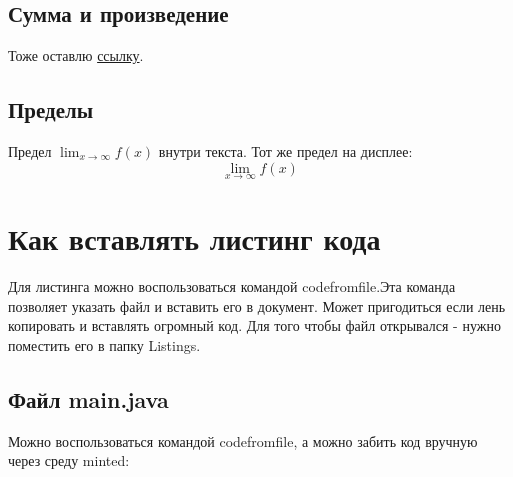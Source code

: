     \subsection{Сумма и произведение}
    Тоже оставлю \href{https://www.overleaf.com/learn/latex/Integrals,_sums_and_limits#Sums_and_products}{ссылку}.
    
    \subsection{Пределы}
    
    Предел \(\lim_{x\to\infty} f(x)\) внутри текста.
    Тот же предел на дисплее:
    \[
    \lim_{x\to\infty} f(x)
    \]

\section{Как вставлять листинг кода}




Для листинга можно воспользоваться командой codefromfile.Эта команда позволяет указать файл и вставить его в документ. Может пригодиться если лень копировать и вставлять огромный код. Для того чтобы файл открывался - нужно поместить его в папку Listings.

\subsection*{Файл main.java}





\newpage
Можно воспользоваться командой codefromfile, а можно забить код вручную через среду minted:

